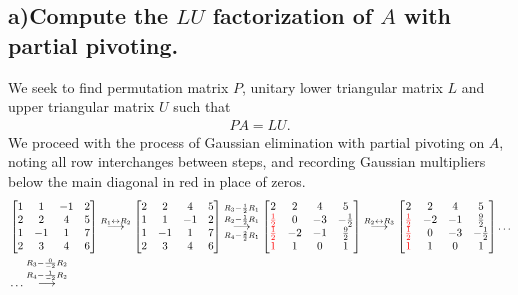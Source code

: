 \documentclass[11pt, letterpaper]{article}
\begin{document}
\subsection*{a)\normalfont Compute the $LU$ factorization of $A$ with partial pivoting.}
We seek to find permutation matrix $P$, unitary lower triangular matrix $L$ and upper triangular matrix
$U$ such that
\begin{align*}
    PA=LU.
\end{align*}
We proceed with the process of Gaussian elimination with partial pivoting on $A$, noting all row interchanges
between steps, and recording Gaussian multipliers below the main diagonal in {\color{red}red} in place of zeros.
\begin{align*}
    &\begin{bmatrix}
        1 & 1 & -1& 2\\
        2 & 2 & 4 & 5\\
        1 & -1 & 1 & 7\\
        2 & 3 & 4 & 6
    \end{bmatrix}
    \overset{R_1\leftrightarrow R_2}{\longrightarrow}
    \begin{bmatrix}
        2 & 2 & 4 & 5\\
        1 & 1 & -1& 2\\
        1 & -1 & 1 & 7\\
        2 & 3 & 4 & 6
    \end{bmatrix}
    \underset{R_4-\frac{2}{2}R_1}{\overset{R_3 - \frac{1}{2}R_1}{\overset{R_2 - \frac{1}{2}R_1}{\longrightarrow}}}
    \begin{bmatrix}
        2 & 2 & 4 & 5\\
        {\color{red}\frac{1}{2}} & 0 & -3& -\frac{1}{2}\\
        {\color{red}\frac{1}{2}}  & -2 & -1 & \frac{9}{2}\\
        {\color{red}1}  & 1 & 0 & 1
    \end{bmatrix}
    \overset{R_2\leftrightarrow R_3}{\longrightarrow}
    \begin{bmatrix}
        2 & 2 & 4 & 5\\
        {\color{red}\frac{1}{2}}  & -2 & -1 & \frac{9}{2}\\
        {\color{red}\frac{1}{2}} & 0 & -3& -\frac{1}{2}\\
        {\color{red}1}  & 1 & 0 & 1
    \end{bmatrix}
    \dots\\
    &\dots \overset{R_3-\frac{0}{-2}R_2}{\overset{R_4-\frac{1}{-2}R_2}{\longrightarrow}}

\end{align*}
\end{document}
